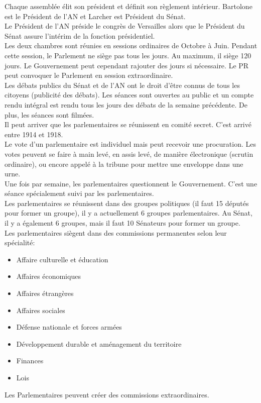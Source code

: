 \documentclass[12pt, a4paper, openany]{book}
\begin{document}
Chaque assemblée élit son président et définit son règlement intérieur. Bartolone est le Président de l'AN et Larcher est Président du Sénat. \\
Le Président de l'AN préside le congrès de Versailles alors que le Président du Sénat assure l'intérim de la fonction présidentiel. \\
Les deux chambres sont réunies en sessions ordinaires de Octobre à Juin. Pendant cette session, le Parlement ne siège pas tous les jours. Au maximum, il siège 120 jours. Le Gouvernement peut cependant rajouter des jours si nécessaire. Le PR peut convoquer le Parlement en session extraordinaire. \\
Les débats publics du Sénat et de l'AN ont le droit d'être connus de tous les citoyens (publicité des débats). Les séances sont ouvertes au public et un compte rendu intégral est rendu tous les jours des débats de la semaine précédente. De plus, les séances sont filmées. \\
Il peut arriver que les parlementaires se réunissent en comité secret. C'est arrivé entre 1914 et 1918. \\
Le vote d'un parlementaire est individuel mais peut recevoir une procuration. Les votes peuvent se faire à main levé, en assis levé, de manière électronique (scrutin ordinaire), ou encore appelé à la tribune pour mettre une enveloppe dans une urne. \\
Une fois par semaine, les parlementaires questionnent le Gouvernement. C'est une séance spécialement suivi par les parlementaires. \\
Les parlementaires se réunissent dans des groupes politiques (il faut 15 députés pour former un groupe), il y a actuellement 6 groupes parlementaires. Au Sénat, il y a également 6 groupes, mais il faut 10 Sénateurs pour former un groupe. \\
Les parlementaires siègent dans des commissions permanentes selon leur spécialité: \\
\begin{itemize}
\item Affaire culturelle et éducation 
\item Affaires économiques 
\item Affaires étrangères
\item Affaires sociales
\item Défense nationale et forces armées
\item Développement durable et aménagement du territoire
\item Finances
\item Lois 
\end{itemize}
Les Parlementaires peuvent créer des commissions extraordinaires.
\end{document}
